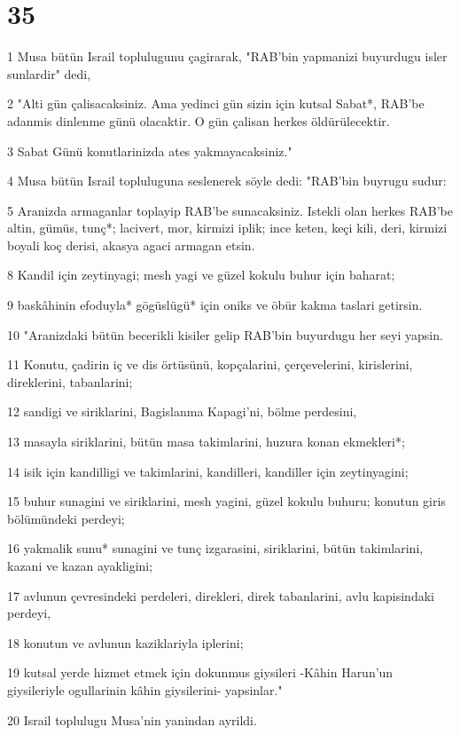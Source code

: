 \chapter{35}

\par 1 Musa bütün Israil toplulugunu çagirarak, "RAB'bin yapmanizi buyurdugu isler sunlardir" dedi,
\par 2 "Alti gün çalisacaksiniz. Ama yedinci gün sizin için kutsal Sabat*, RAB'be adanmis dinlenme günü olacaktir. O gün çalisan herkes öldürülecektir.
\par 3 Sabat Günü konutlarinizda ates yakmayacaksiniz."
\par 4 Musa bütün Israil topluluguna seslenerek söyle dedi: "RAB'bin buyrugu sudur:
\par 5 Aranizda armaganlar toplayip RAB'be sunacaksiniz. Istekli olan herkes RAB'be altin, gümüs, tunç*; lacivert, mor, kirmizi iplik; ince keten, keçi kili, deri, kirmizi boyali koç derisi, akasya agaci armagan etsin.
\par 8 Kandil için zeytinyagi; mesh yagi ve güzel kokulu buhur için baharat;
\par 9 baskâhinin efoduyla* gögüslügü* için oniks ve öbür kakma taslari getirsin.
\par 10 "Aranizdaki bütün becerikli kisiler gelip RAB'bin buyurdugu her seyi yapsin.
\par 11 Konutu, çadirin iç ve dis örtüsünü, kopçalarini, çerçevelerini, kirislerini, direklerini, tabanlarini;
\par 12 sandigi ve siriklarini, Bagislanma Kapagi'ni, bölme perdesini,
\par 13 masayla siriklarini, bütün masa takimlarini, huzura konan ekmekleri*;
\par 14 isik için kandilligi ve takimlarini, kandilleri, kandiller için zeytinyagini;
\par 15 buhur sunagini ve siriklarini, mesh yagini, güzel kokulu buhuru; konutun giris bölümündeki perdeyi;
\par 16 yakmalik sunu* sunagini ve tunç izgarasini, siriklarini, bütün takimlarini, kazani ve kazan ayakligini;
\par 17 avlunun çevresindeki perdeleri, direkleri, direk tabanlarini, avlu kapisindaki perdeyi,
\par 18 konutun ve avlunun kaziklariyla iplerini;
\par 19 kutsal yerde hizmet etmek için dokunmus giysileri -Kâhin Harun'un giysileriyle ogullarinin kâhin giysilerini- yapsinlar."
\par 20 Israil toplulugu Musa'nin yanindan ayrildi.
